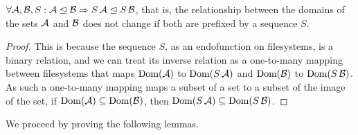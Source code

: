 \begin{myclm}
$\forall \mathcal{A},\mathcal{B},S: {\mathcal{A}}\trianglelefteq{\mathcal{B}} \Rightarrow {S\,\mathcal{A}}\trianglelefteq{S\,\mathcal{B}}$,
that is,
the relationship between the domains of the sets $\mathcal{A}$ and $\mathcal{B}$ 
does not change if both are prefixed by a sequence $S$.
\end{myclm}
\begin{proof}
This is because the sequence $S$, as an endofunction on filesystems, is a binary relation,
and we can treat its inverse relation as a one-to-many mapping between filesystems
that maps $\textrm{Dom}({\mathcal{A}})$ to $\textrm{Dom}({S\,\mathcal{A}})$ and $\textrm{Dom}({\mathcal{B}})$ to $\textrm{Dom}({S\,\mathcal{B}})$.
As such a one-to-many mapping maps a subset of a set to a subset of the image of the set,
if $\textrm{Dom}({\mathcal{A}})\subseteq\textrm{Dom}({\mathcal{B}})$, then $\textrm{Dom}({S\,\mathcal{A}})\subseteq\textrm{Dom}({S\,\mathcal{B}})$.
\end{proof}

We proceed by proving the following lemmas.


